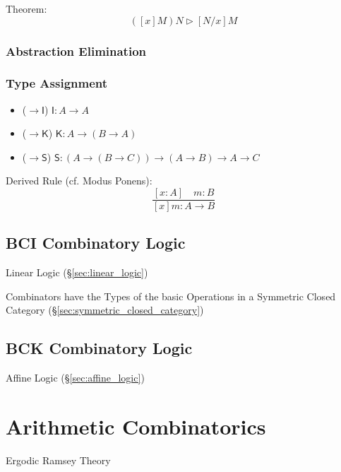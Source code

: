 Theorem:
\[
  ([x]M)N \rhd [N/x]M
\]



\subsubsection{Abstraction Elimination}
\label{sec:abstraction_elimination}



\subsubsection{Type Assignment}\label{sec:combinatory_type}
\cite{seldin03}

\begin{itemize}
  \item ($\rightarrow \mathsf{I}$) $\mathsf{I}: A \rightarrow A$
  \item ($\rightarrow \mathsf{K}$)
    $\mathsf{K}: A \rightarrow (B \rightarrow A)$
  \item ($\rightarrow \mathsf{S}$)
    $\mathsf{S}: (A \rightarrow (B \rightarrow C))
      \rightarrow (A \rightarrow B) \rightarrow A \rightarrow C$
\end{itemize}

Derived Rule (cf. Modus Ponens):
\[
  \frac{
    [x:A] \quad m:B
  }{
    [x]m:A \rightarrow B
  }
\]



\subsection{BCI Combinatory Logic}\label{sec:bci_logic}

Linear Logic (\S\ref{sec:linear_logic})

Combinators have the Types of the basic Operations in a Symmetric
Closed Category (\S\ref{sec:symmetric_closed_category})


\subsection{BCK Combinatory Logic}\label{sec:bck_logic}

Affine Logic (\S\ref{sec:affine_logic})



\section{Arithmetic Combinatorics}\label{sec:arithmetic_combinatorics}

Ergodic Ramsey Theory
